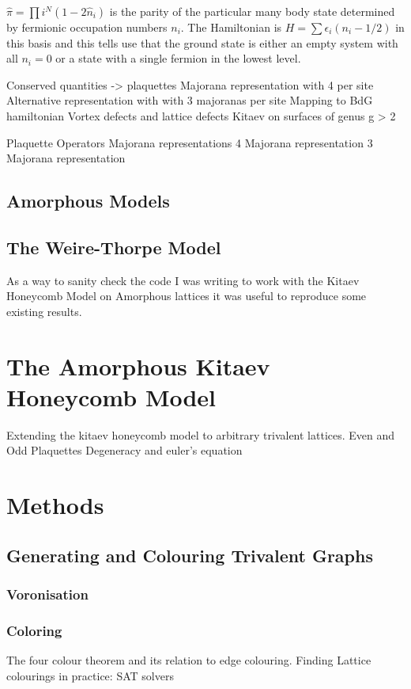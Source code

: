 \(\hat{\pi} = \prod{i}^{N} (1 - 2\hat{n}_i)\) is the parity of the particular many body state determined by fermionic occupation numbers \(n_i\). The Hamiltonian is \(H = \sum \epsilon_i (n_i - 1/2)\) in this basis and this tells use that the ground state is either an empty system with all \(n_i = 0\) or a state with a single fermion in the lowest level. 

	        Conserved quantities -> plaquettes
			Majorana representation with 4 per site
			Alternative representation with with 3 majoranas per site
			Mapping to BdG hamiltonian
			Vortex defects and lattice defects
		    Kitaev on surfaces of genus g > 2

Plaquette Operators
Majorana representations
4 Majorana representation
3 Majorana representation
		    
\subsection{Amorphous Models}
			\subsection{The Weire-Thorpe Model}
			As a way to sanity check the code I was writing to work with the Kitaev Honeycomb Model on Amorphous lattices it was useful to reproduce some existing results. 
		
	

\section{The Amorphous Kitaev Honeycomb Model}
		Extending the kitaev honeycomb model to arbitrary trivalent lattices.
		Even and Odd Plaquettes
        Degeneracy and euler's equation


\section{Methods}
        \subsection{Generating and Colouring Trivalent Graphs}
		\subsubsection{Voronisation}
		\subsubsection{Coloring}
		    The four colour theorem and its relation to edge colouring.
		    Finding Lattice colourings in practice: SAT solvers 
		

